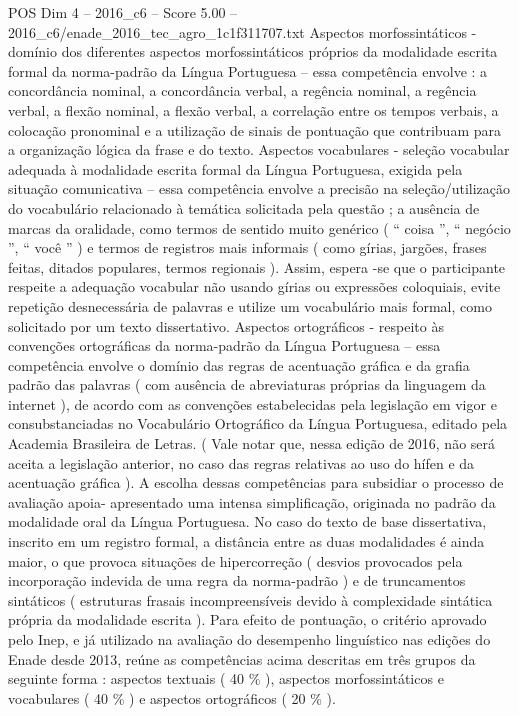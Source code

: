 \begin{textsample}{POS Dim 4 – 2016\_c6 – Score 5.00 – 2016\_c6/enade\_2016\_tec\_agro\_1c1f311707.txt}
Aspectos morfossintáticos - domínio dos diferentes aspectos morfossintáticos próprios da modalidade escrita formal da norma-padrão da Língua Portuguesa – essa competência envolve : a concordância nominal, a concordância verbal, a regência nominal, a regência verbal, a flexão nominal, a flexão verbal, a correlação entre os tempos verbais, a colocação pronominal e a utilização de sinais de pontuação que contribuam para a organização lógica da frase e do texto.
Aspectos vocabulares - seleção vocabular adequada à modalidade escrita formal da Língua Portuguesa, exigida pela situação comunicativa – essa competência envolve a precisão na seleção/utilização do vocabulário relacionado à temática solicitada pela questão ; a ausência de marcas da oralidade, como termos de sentido muito genérico ( “ coisa ”, “ negócio ”, “ você ” ) e termos de registros mais informais ( como gírias, jargões, frases feitas, ditados populares, termos regionais ).
Assim, espera -se que o participante respeite a adequação vocabular não usando gírias ou expressões coloquiais, evite repetição desnecessária de palavras e utilize um vocabulário mais formal, como solicitado por um texto dissertativo.
Aspectos ortográficos - respeito às convenções ortográficas da norma-padrão da Língua Portuguesa – essa competência envolve o domínio das regras de acentuação gráfica e da grafia padrão das palavras ( com ausência de abreviaturas próprias da linguagem da internet ), de acordo com as convenções estabelecidas pela legislação em vigor e consubstanciadas no Vocabulário Ortográfico da Língua Portuguesa, editado pela Academia Brasileira de Letras. ( Vale notar que, nessa edição de 2016, não será aceita a legislação anterior, no caso das regras relativas ao uso do hífen e da acentuação gráfica ).
A escolha dessas competências para subsidiar o processo de avaliação apoia- apresentado uma intensa simplificação, originada no padrão da modalidade oral da Língua Portuguesa.
No caso do texto de base dissertativa, inscrito em um registro formal, a distância entre as duas modalidades é ainda maior, o que provoca situações de hipercorreção ( desvios provocados pela incorporação indevida de uma regra da norma-padrão ) e de truncamentos sintáticos ( estruturas frasais incompreensíveis devido à complexidade sintática própria da modalidade escrita ).
Para efeito de pontuação, o critério aprovado pelo Inep, e já utilizado na avaliação do desempenho linguístico nas edições do Enade desde 2013, reúne as competências acima descritas em três grupos da seguinte forma : aspectos textuais ( 40 \% ), aspectos morfossintáticos e vocabulares ( 40 \% ) e aspectos ortográficos ( 20 \% ).

\end{textsample}
